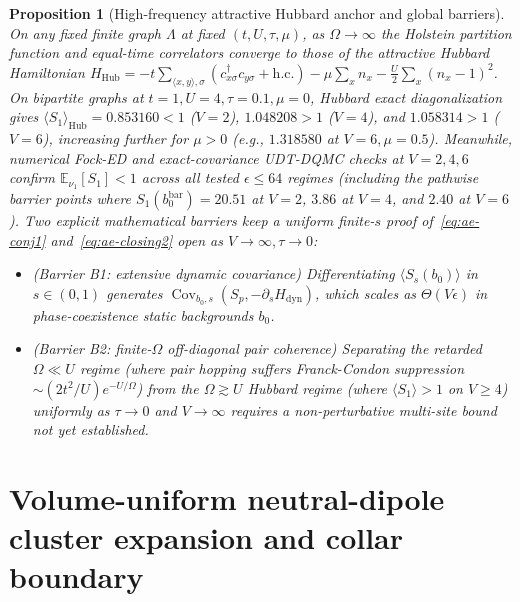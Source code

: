 \documentclass[11pt]{article}
\newtheorem{proposition}[theorem]{Proposition}
\theoremstyle{definition}
\theoremstyle{remark}
\DeclareMathOperator{\Cov}{Cov}
\newcommand{\E}{\mathbb{E}}
\begin{document}
\begin{proposition}[High-frequency attractive Hubbard anchor and global barriers]
\label{prop:ae-hubbard}
On any fixed finite graph $\Lambda$ at fixed $(t, U, \tau, \mu)$, as $\Omega \to \infty$
the Holstein partition function and equal-time correlators converge to those of
the attractive Hubbard Hamiltonian $H_{\mathrm{Hub}} = -t\sum_{\langle x,y\rangle,\sigma}(c_{x\sigma}^\dagger c_{y\sigma} + \mathrm{h.c.}) - \mu\sum_x n_x - \frac{U}{2}\sum_x(n_x - 1)^2$.
On bipartite graphs at $t=1, U=4, \tau=0.1, \mu=0$, Hubbard exact diagonalization
gives $\langle S_1\rangle_{\mathrm{Hub}} = 0.853160 < 1$ ($V=2$), $1.048208 > 1$ ($V=4$),
and $1.058314 > 1$ ($V=6$), increasing further for $\mu > 0$ (e.g., $1.318580$ at
$V=6, \mu=0.5$). Meanwhile, numerical Fock-ED and exact-covariance UDT-DQMC checks
at $V = 2, 4, 6$ confirm $\E_{\nu_1}[S_1] < 1$ across all tested $\epsilon \le 64$
regimes (including the pathwise barrier points where $S_1(b_0^{\mathrm{bar}}) = 20.51$ at $V=2$,
$3.86$ at $V=4$, and $2.40$ at $V=6$). Two explicit mathematical barriers keep a
uniform finite-$s$ proof of~\eqref{eq:ae-conj1} and~\eqref{eq:ae-closing2} open
as $V \to \infty, \tau \to 0$:
\begin{itemize}[leftmargin=1.5em]
\item \emph{(Barrier B1: extensive dynamic covariance)} Differentiating
$\langle S_s(b_0)\rangle$ in $s \in (0,1)$ generates $\Cov_{b_0,s}(S_p, -\partial_s H_{\mathrm{dyn}})$,
which scales as $\Theta(V\epsilon)$ in phase-coexistence static backgrounds $b_0$.
\item \emph{(Barrier B2: finite-$\Omega$ off-diagonal pair coherence)} Separating
the retarded $\Omega \ll U$ regime (where pair hopping suffers Franck-Condon
suppression $\sim (2t^2/U)e^{-U/\Omega}$) from the $\Omega \gtrsim U$ Hubbard
regime (where $\langle S_1\rangle > 1$ on $V \ge 4$) uniformly as $\tau \to 0$
and $V \to \infty$ requires a non-perturbative multi-site bound not yet established.
\end{itemize}
\end{proposition}

\section{Volume-uniform neutral-dipole cluster expansion and collar boundary}
\label{sec:neutral-dipole}
 
\end{document}
